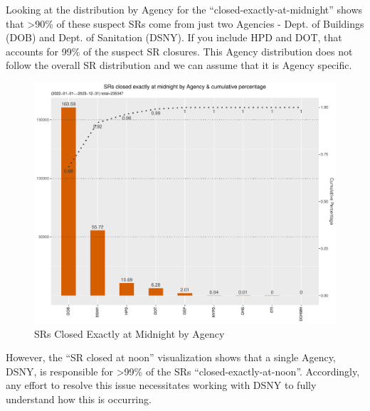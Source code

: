 \documentclass[12pt, titlepage]{article}
\begin{document}
	Looking at the distribution by Agency for the ``closed-exactly-at-midnight'' 
	shows that \textgreater90\% of these suspect SRs come from just two 
	Agencies - Dept. of Buildings (DOB) and Dept. of Sanitation (DSNY). 
	If you include HPD and DOT, that accounts for 99\% of the suspect 
	SR closures. This Agency distribution does not follow the overall 
	SR distribution and we can assume that it is Agency specific. 

	\begin{figure}[tbp]
		\centering
		\includegraphics[width = \textwidth]{closed_at_midnight_chart.pdf}
		\caption{SRs Closed Exactly at Midnight by Agency}
		\label{fig:midnight-closed}
	\end{figure}	

	However, the ``SR closed at noon'' visualization shows that  a single 
	Agency, DSNY, is responsible for \textgreater99\% of the 
	SRs ``closed-exactly-at-noon''. Accordingly, any effort to 
	resolve this issue necessitates working with DSNY to fully understand 
	how this is occurring. 
	
\end{document}
